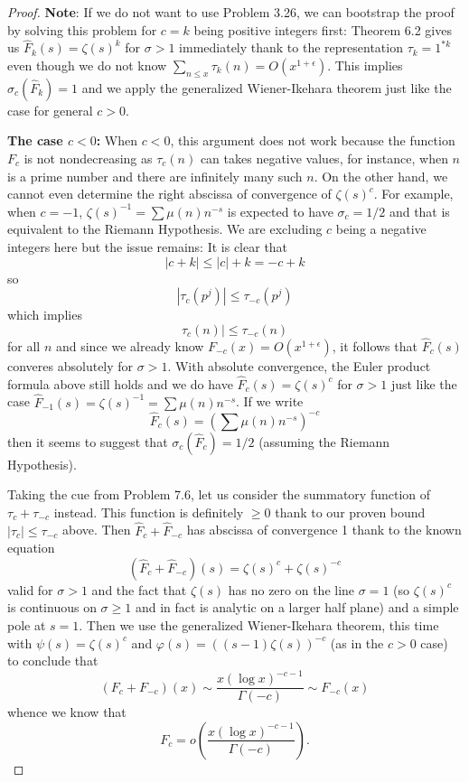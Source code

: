 \documentclass[12pt]{article}
\newcommand{\Fhat}{\widehat{F}}
\begin{document}
\begin{proof}
\textbf{Note}: If we do not want to use Problem 3.26, we can bootstrap the proof by solving this problem for $c = k$ being positive integers first: Theorem 6.2 gives us $\Fhat_k(s) = \zeta(s)^k$ for $\sigma > 1$ immediately thank to the representation $\tau_k = 1^{*k}$ even though we do not know $\sum_{n \leq x} \tau_k(n) = O(x^{1 + \epsilon})$. This implies $\sigma_c(\Fhat_k) = 1$ and we apply the generalized Wiener-Ikehara theorem just like the case for general $c > 0$.

\noindent \textbf{The case $c < 0$:} When $c < 0$, this argument does not work because the function $F_c$ is not nondecreasing as $\tau_c(n)$ can takes negative values, for instance, when $n$ is a prime number and there are infinitely many such $n$. On the other hand, we cannot even determine the right abscissa of convergence of $\zeta(s)^c$.
For example, when $c = -1$, $\zeta(s)^{-1} = \sum \mu(n) n^{-s}$ is expected to have $\sigma_c = 1/2$ and that is equivalent to the Riemann Hypothesis.
We are excluding $c$ being a negative integers here but the issue remains: It is clear that
$$|c + k| \leq |c| + k = -c + k$$
so
$$|\tau_c(p^j)| \leq \tau_{-c}(p^j)$$
which implies
$$\tau_c(n)| \leq \tau_{-c}(n)$$
for all $n$ and since we already know $F_{-c}(x) = O(x^{1 + \epsilon})$, it follows that $\Fhat_c(s)$ converes absolutely for $\sigma > 1$. With absolute convergence, the Euler product formula above still holds and we do have $\Fhat_c(s) = \zeta(s)^c$ for $\sigma > 1$ just like the case $\Fhat_{-1}(s) = \zeta(s)^{-1} = \sum \mu(n) n^{-s}$. If we write
$$\Fhat_c(s) = \left(\sum \mu(n) n^{-s}\right)^{-c}$$
then it seems to suggest that $\sigma_c(\Fhat_c) = 1/2$ (assuming the Riemann Hypothesis).

Taking the cue from Problem 7.6, let us consider the summatory function of $\tau_c + \tau_{-c}$ instead. This function is definitely $\geq 0$ thank to our proven bound $|\tau_c| \leq \tau_{-c}$ above. Then $\Fhat_c + \Fhat_{-c}$ has abscissa of convergence 1 thank to the known equation
$$(\Fhat_c + \Fhat_{-c})(s) = \zeta(s)^c + \zeta(s)^{-c}$$
valid for $\sigma > 1$ and the fact that $\zeta(s)$ has no zero on the line $\sigma = 1$ (so $\zeta(s)^c$ is continuous on $\sigma \geq 1$ and in fact is analytic on a larger half plane) and a simple pole at $s = 1$. Then we use the generalized Wiener-Ikehara theorem, this time with $\psi(s) = \zeta(s)^c$ and $\varphi(s) = ((s-1)\zeta(s))^{-c}$ (as in the $c > 0$ case) to conclude that
$$(F_c + F_{-c})(x) \sim \frac{x (\log x)^{-c - 1}}{\Gamma(-c)} \sim F_{-c}(x)$$
whence we know that
$$F_c = o\left( \frac{x (\log x)^{-c - 1}}{\Gamma(-c)} \right).$$


\end{proof}
\end{document}
